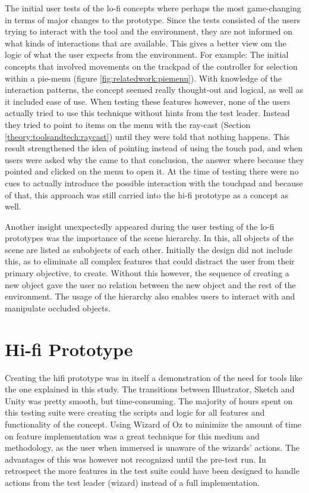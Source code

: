 The initial user tests of the lo-fi concepts where perhaps the most game-changing in terms of major changes to the prototype. Since the tests consisted of the users trying to interact with the tool and the environment, they are not informed on what kinds of interactions that are available. This gives a better view om the logic of what the user expects from the environment. For example: The initial concepts that involved movements on the trackpad of the controller for selection within a pie-menu (figure \ref{fig:relatedwork:piemenu}). With knowledge of the interaction patterns, the concept seemed really thought-out and logical, as well as it included ease of use. When testing these features however, none of the users actually tried to use this technique without hints from the test leader. Instead they tried to point to items on the menu with the ray-cast (Section \ref{theory:toolsandtech:raycast}) until they were told that nothing happens. This result strengthened the idea of pointing instead of using the touch pad, and when users were asked why the came to that conclusion, the answer where because they pointed and clicked on the menu to open it. At the time of testing there were no cues to actually introduce the possible interaction with the touchpad and because of that, this approach was still carried into the hi-fi prototype as a concept as well.

Another insight unexpectedly appeared during the user testing of the lo-fi prototypes was the importance of the scene hierarchy. In this, all objects of the scene are listed as subobjects of each other. Initially the design did not include this, as to eliminate all complex features that could distract the user from their primary objective, to create. Without this however, the sequence of creating a new object gave the user no relation between the new object and the rest of the environment. The usage of the hierarchy also enables users to interact with and manipulate occluded objects.


\section{Hi-fi Prototype}
Creating the hifi prototype was in itself a demonstration of the need for tools like the one explained in this study. The transitions between Illustrator, Sketch and Unity was pretty smooth, but time-consuming. The majority of hours spent on this testing suite were creating the scripts and logic for all features and functionality of the concept. Using Wizard of Oz to minimize the amount of time on feature implementation was a great technique for this medium and methodology, as the user when immersed is unaware of the wizards' actions. The advantages of this was however not recognized until the pre-test run. In retrospect the more features in the test suite could have been designed to handle actions from the test leader (wizard) instead of a full implementation.

